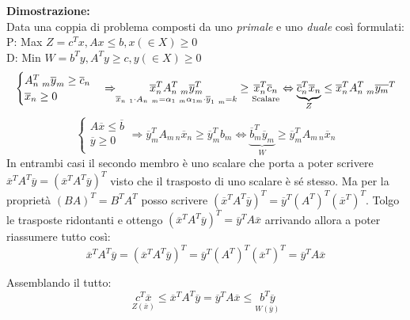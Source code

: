 \documentclass{article}
\begin{document}
\begin{tcolorbox}
  \textbf{Dimostrazione:}\\
  Data una coppia  di problema composti da uno \textit{primale} e uno \textit{duale} così formulati:\\
  \hspace{3cm}P: Max $Z=c^Tx, Ax \le b, x (\in X) \ge 0$\\
  \hspace{3cm}D: Min $W=b^Ty, A^Ty\ge c, y(\in X) \ge 0$\\
  $$
    \begin{cases}
      A^T_{n \ m}\overline{y}_m \ge \overline{c}_n \\
      \overline{x}_n \ge 0                         \\
    \end{cases}
    {\Rightarrow} \underset{\overline{x}_{n\ 1}\cdot A_{n\ m} = \alpha_{1\ m} \\ \alpha_{1 m}\cdot \overline{y}_{1\ m} = k}{\overline{x}_n^TA^T_{n\ m}\overline{y}^T_m} \ge \underset{\text{Scalare}}{\overline{x}_n^T\overline{c}_n} \Leftrightarrow \underbrace{\overline{c}_n^T\overline{x}_n}_{Z} \le \overline{x}_n^TA_{n\ m}^T\overline{y_m}^T
  $$
  $$
    \begin{cases}
      A\overline{x} \le \overline{b} \\
      \overline{y}\ge 0              \\
    \end{cases}
    {\Rightarrow} \overline{y}_m^TA_{m\ n}\overline{x}_n \ge \overline{y}_m^Tb_m \Leftrightarrow \underbrace{\overline{b}_m^T\overline{y}_m}_{W} \ge \overline{y}_m^TA_{m\ n}\overline{x}_n
  $$
  In entrambi casi il secondo membro è uno scalare che porta a poter scrivere $\overline{x}^TA^T\overline{y}=(\overline{x}^TA^T\overline{y})^T$ visto che il trasposto di uno scalare è sé stesso. Ma per la proprietà $(BA)^T=B^TA^T$ posso scrivere $(\overline{x}^TA^T\overline{y})^T=\overline{y}^T (A^T)^T (\overline{x}^T)^T$. Tolgo le trasposte ridontanti e ottengo $(\overline{x}^TA^T\overline{y})^T=\overline{y}^TA\overline{x}$ arrivando allora a poter riassumere tutto così:
  $$\overline{x}^T A^T \overline{y} = (\overline{x}^T A^T \overline{y})^T = \overline{y}^T (A^T)^T (\overline{x}^T)^T = \overline{y}^T A \overline{x}$$

  Assemblando il tutto:
  $$\underset{Z(\overline{x})}{c^T \overline{x}} \leq \overline{x}^T A^T \overline{y} = \overline{y}^T A \overline{x} \leq \underset{W(\overline{y})}{b^T \overline{y}}$$
\end{tcolorbox}
\end{document}

